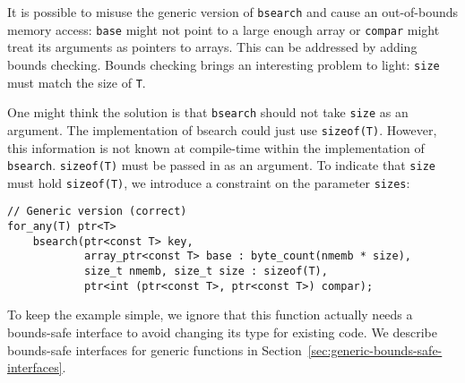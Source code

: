 It is possible to misuse the generic version of \lstinline+bsearch+ and cause
an out-of-bounds memory access: \lstinline+base+ might not point to a
large enough array or \lstinline+compar+ might treat its arguments as pointers to arrays.
This can be addressed by adding bounds checking.  Bounds checking brings
an interesting problem to light: \lstinline+size+  must match the size of \lstinline+T+.

One might think the solution is that \lstinline+bsearch+ should not take 
\lstinline+size+ as an argument.  The implementation of bsearch could just 
use \lstinline+sizeof(T)+. However, this information is not known at compile-time
within the implementation of \lstinline+bsearch+.   \lstinline+sizeof(T)+
must be passed in as an argument.  To indicate that \lstinline+size+ must
hold \lstinline+sizeof(T)+, we introduce a constraint on the parameter \lstinline+sizes+:
\begin{lstlisting}
// Generic version (correct)
for_any(T) ptr<T> 
    bsearch(ptr<const T> key,
            array_ptr<const T> base : byte_count(nmemb * size),
            size_t nmemb, size_t size : sizeof(T),
            ptr<int (ptr<const T>, ptr<const T>) compar);
\end{lstlisting}
To keep the example simple, we ignore that this function actually needs a 
bounds-safe interface to avoid changing its type for existing code.  
We describe  bounds-safe interfaces for generic
functions in Section~\ref{sec:generic-bounds-safe-interfaces}.

